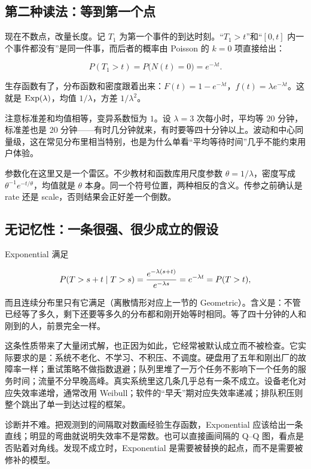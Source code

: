 \subsection{第二种读法：等到第一个点}

现在不数点，改量长度。记 \(T_1\) 为第一个事件的到达时刻。``\(T_1>t\)''和``\([0,t]\) 内一个事件都没有''是同一件事，而后者的概率由 Poisson 的 \(k=0\) 项直接给出：

\[
P(T_1>t)=P\bigl(N(t)=0\bigr)=e^{-\lambda t}.
\]

生存函数有了，分布函数和密度跟着出来：\(F(t)=1-e^{-\lambda t}\)，\(f(t)=\lambda e^{-\lambda t}\)。这就是 \(\operatorname{Exp}(\lambda)\)，均值 \(1/\lambda\)，方差 \(1/\lambda^2\)。

注意标准差和均值相等，变异系数恒为 \(1\)。设 \(\lambda=3\) 次每小时，平均等 \(20\) 分钟，标准差也是 \(20\) 分钟——有时几分钟就来，有时要等四十分钟以上。波动和中心同量级，这在常见分布里相当特别，也是为什么单看``平均等待时间''几乎不能约束用户体验。

参数化在这里又是一个雷区。不少教材和函数库用尺度参数 \(\theta=1/\lambda\)，密度写成 \(\theta^{-1}e^{-t/\theta}\)，均值就是 \(\theta\) 本身。同一个符号位置，两种相反的含义。传参之前确认是 rate 还是 scale，否则结果会正好差一个倒数。

\subsection{无记忆性：一条很强、很少成立的假设}

Exponential 满足

\[
P(T>s+t\mid T>s)=\frac{e^{-\lambda(s+t)}}{e^{-\lambda s}}=e^{-\lambda t}=P(T>t),
\]

而且连续分布里只有它满足（离散情形对应上一节的 Geometric）。含义是：不管已经等了多久，剩下还要等多久的分布都和刚开始等时相同。等了四十分钟的人和刚到的人，前景完全一样。

这条性质带来了大量闭式解，也正因为如此，它经常被默认成立而不被检查。它实际要求的是：系统不老化、不学习、不积压、不调度。硬盘用了五年和刚出厂的故障率一样；重试策略不做指数退避；队列里堆了一万个任务不影响下一个任务的服务时间；流量不分早晚高峰。真实系统里这几条几乎总有一条不成立。设备老化对应失效率递增，通常改用 Weibull；软件的``早夭''期对应失效率递减；排队积压则整个跳出了单一到达过程的框架。

诊断并不难。把观测到的间隔取对数画经验生存函数，Exponential 应该给出一条直线；明显的弯曲就说明失效率不是常数。也可以直接画间隔的 Q--Q 图，看点是否贴着对角线。发现不成立时，Exponential 是需要被替换的起点，而不是需要被修补的模型。

